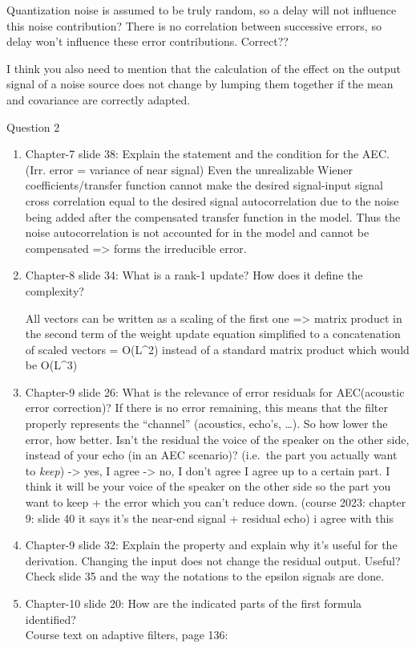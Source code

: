 \documentclass[
  a4paper,
  ,captions=tableheading
]{scrartcl}
\begin{document}
\begin{enumerate}
  Quantization noise is assumed to be truly random, so a delay will not
  influence this noise contribution? There is no correlation between
  successive errors, so delay won't influence these error contributions.
  Correct??

  I think you also need to mention that the calculation of the effect on
  the output signal of a noise source does not change by lumping them
  together if the mean and covariance are correctly adapted.
\end{enumerate}

Question 2

\begin{enumerate}
\def\labelenumi{\arabic{enumi}.}
\item
  Chapter-7 slide 38: Explain the statement and the condition for the
  AEC. (Irr. error = variance of near signal) Even the unrealizable
  Wiener coefficients/transfer function cannot make the desired
  signal-input signal cross correlation equal to the desired signal
  autocorrelation due to the noise being added after the compensated
  transfer function in the model. Thus the noise autocorrelation is not
  accounted for in the model and cannot be compensated =\textgreater{}
  forms the irreducible error.\\
\item
  Chapter-8 slide 34: What is a rank-1 update? How does it define the
  complexity?

  All vectors can be written as a scaling of the first one
  =\textgreater{} matrix product in the second term of the weight update
  equation simplified to a concatenation of scaled vectors = O(L\^{}2)
  instead of a standard matrix product which would be O(L\^{}3)
\item
  Chapter-9 slide 26: What is the relevance of error residuals for
  AEC(acoustic error correction)? If there is no error remaining, this
  means that the filter properly represents the ``channel'' (acoustics,
  echo's, \ldots). So how lower the error, how better. Isn't the
  residual the voice of the speaker on the other side, instead of your
  echo (in an AEC scenario)? (i.e.~the part you actually want to
  \emph{keep}) -\textgreater{} yes, I agree -\textgreater{} no, I don't
  agree I agree up to a certain part. I think it will be your voice of
  the speaker on the other side so the part you want to keep + the error
  which you can't reduce down. (course 2023: chapter 9: slide 40 it says
  it's the near-end signal + residual echo) i agree with this\\
\item
  Chapter-9 slide 32: Explain the property and explain why it's useful
  for the derivation. Changing the input does not change the residual
  output. Useful? Check slide 35 and the way the notations to the
  epsilon signals are done.\\
\item
  Chapter-10 slide 20: How are the indicated parts of the first formula
  identified?\\
  Course text on adaptive filters, page 136:\\
\end{enumerate}
\end{document}
